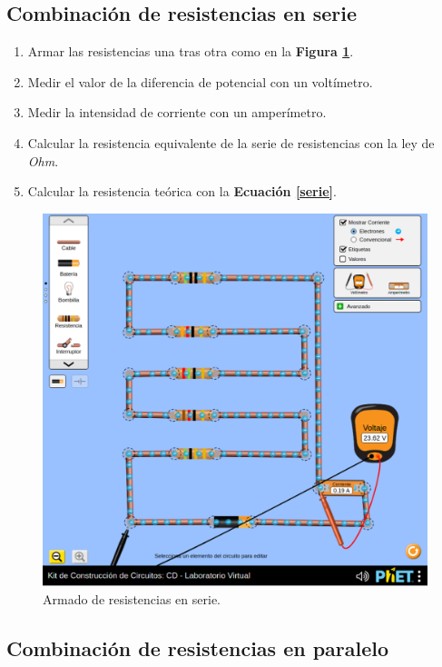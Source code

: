 \documentclass[letter,11pt]{article}
\begin{document}
\subsection{Combinación de resistencias en serie}

\begin{enumerate}
\item Armar las resistencias una tras otra como en la
    \textbf{Figura \ref{figura3}}.
\item Medir el valor de la diferencia de potencial con un voltímetro.
\item Medir la intensidad de corriente con un amperímetro.
\item Calcular la resistencia equivalente de la serie de resistencias con la
    ley de \emph{Ohm}.
\item Calcular la resistencia teórica con la \textbf{Ecuación \ref{serie}}.
\end{enumerate}

\begin{figure}[!h]
\centering
\includegraphics[scale=0.45]{resources/figura3.eps}
\caption{Armado de resistencias en serie.}
\label{figura3}
\end{figure}

\subsection{Combinación de resistencias en paralelo}
\end{document}
